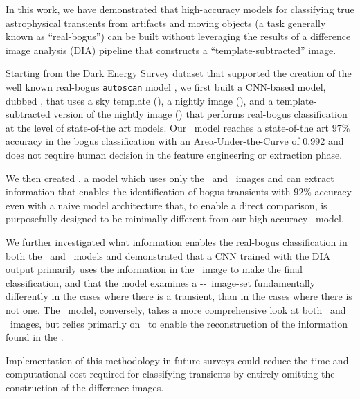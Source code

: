

In this work, we have demonstrated that high-accuracy models for classifying true astrophysical transients from artifacts and moving objects (a task generally known as ``real-bogus'') can be built without leveraging the results of a difference image analysis (DIA) pipeline that constructs a ``template-subtracted'' image.

Starting from the Dark Energy Survey dataset that supported the creation of the well known real-bogus \texttt{autoscan} model \citep{Goldstein_2015}, we first built a CNN-based model, dubbed \diabased, that uses a sky template (\temp), a nightly image (\search), and a template-subtracted version of the nightly image (\diff) that performs real-bogus classification at the level of state-of-the art models.  Our \diabased\ model reaches a state-of-the art $97\%$ accuracy in the bogus classification with an Area-Under-the-Curve of 0.992 and does not require human decision in the feature engineering or extraction phase.

We then created \nodia, a model which uses only the \temp\ and \search\ images and can extract information that enables the identification of bogus transients with $92\%$ accuracy even with a naive model architecture that, to enable a direct comparison, is purposefully designed to be minimally different from our high accuracy \diabased\ model.

We further investigated what information enables the real-bogus classification in both the \diabased\ and \nodia\ models and demonstrated that a CNN trained with the DIA output primarily uses the information in the \diff\ image to make the final classification, and that the model examines a \diff-\search-\temp\ image-set fundamentally differently in the cases where there is a transient, than in the cases where there is not one. The \nodia\ model, conversely, takes a more comprehensive look at both \temp\ and \search\ images, but relies primarily on \temp\ to enable the reconstruction of the information found in the \diff.

Implementation of this methodology in future surveys could reduce the time and computational cost required for classifying transients by entirely omitting the construction of the difference images.  